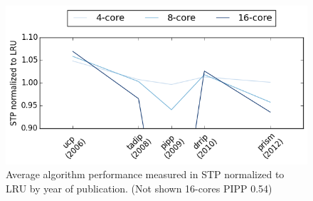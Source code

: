 

\begin{figure}[t]
\centering
\includegraphics[width=\columnwidth]{figures/results/year-comp}
\caption{Average algorithm performance measured in STP normalized to LRU by year of publication. (Not shown 16-cores PIPP 0.54)}
\label{fig:yearlyComparison}
\end{figure}

